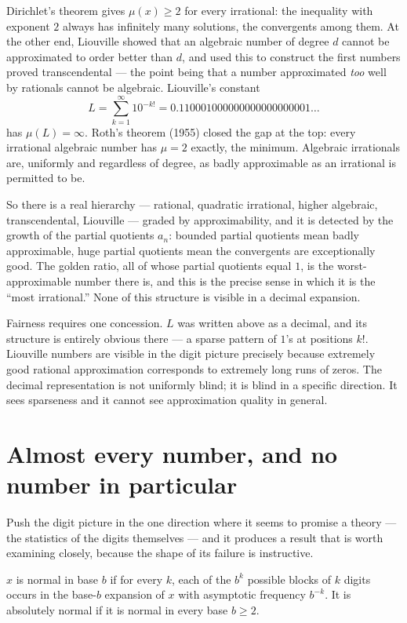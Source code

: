 \documentclass{essay}
\begin{document}
Dirichlet's theorem gives \(\mu(x) \ge 2\) for every irrational: the inequality
with exponent \(2\) always has infinitely many solutions, the convergents among
them. At the other end, Liouville showed that an algebraic number of degree \(d\)
cannot be approximated to order better than \(d\), and used this to construct the
first numbers proved transcendental --- the point being that a number
approximated \emph{too} well by rationals cannot be algebraic. Liouville's
constant
\[ L = \sum_{k=1}^{\infty} 10^{-k!} = 0.110001000000000000000001\ldots \]
has \(\mu(L) = \infty\). Roth's theorem (1955) closed the gap at the top: every
irrational algebraic number has \(\mu = 2\) exactly, the minimum. Algebraic
irrationals are, uniformly and regardless of degree, as badly approximable as
an irrational is permitted to be.

So there is a real hierarchy --- rational, quadratic irrational, higher
algebraic, transcendental, Liouville --- graded by approximability, and it is
detected by the growth of the partial quotients \(a_{n}\): bounded partial
quotients mean badly approximable, huge partial quotients mean the convergents
are exceptionally good. The golden ratio, all of whose partial quotients equal
\(1\), is the worst-approximable number there is, and this is the precise sense in
which it is the ``most irrational.'' None of this structure is visible in a
decimal expansion.

Fairness requires one concession. \(L\) was written above as a decimal, and its
structure is entirely obvious there --- a sparse pattern of \(1\)'s at positions
\(k!\). Liouville numbers are visible in the digit picture precisely because
extremely good rational approximation corresponds to extremely long runs of
zeros. The decimal representation is not uniformly blind; it is blind in a
specific direction. It sees sparseness and it cannot see approximation quality
in general.

\section{Almost every number, and no number in particular}

Push the digit picture in the one direction where it seems to promise a theory
--- the statistics of the digits themselves --- and it produces a result that is
worth examining closely, because the shape of its failure is instructive.

\begin{definition}
  \(x\) is normal in base \(b\) if for every \(k\), each of the \(b^{k}\) possible blocks
  of \(k\) digits occurs in the base-\(b\) expansion of \(x\) with asymptotic frequency
  \(b^{-k}\). It is absolutely normal if it is normal in every base \(b \ge 2\).
\end{definition}
\end{document}
